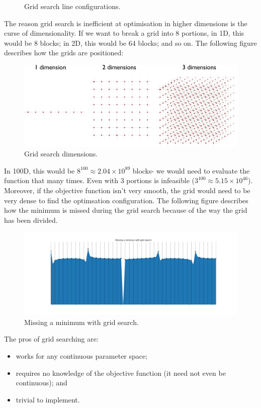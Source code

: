 \documentclass[a4paper, openany]{memoir}
\begin{document}
\begin{figure}[H]
    \caption{Grid search line configurations.}
\end{figure}
The reason grid search is inefficient at optimisation in higher dimensions is the curse of dimensionality. If we want to break a grid into 8 portions, in 1D, this would be 8 blocks; in 2D, this would be 64 blocks; and so on. The following figure describes how the grids are positioned:
\begin{figure}[H]
    \centering
    \includegraphics[scale=0.3]{src/4.13 grid search dimensions.png}
    \caption{Grid search dimensions.}
\end{figure}
\noindent In 100D, this would be $8^{100} \approx 2.04 \times 10^{89}$ blocks- we would need to evaluate the function that many times. Even with 3 portions is infeasible ($3^{100} \approx 5.15 \times 10^{46}$). Moreover, if the objective function isn't very smooth, the grid would need to be very dense to find the optimsation configuration. The following figure describes how the minimum is missed during the grid search because of the way the grid has been divided.
\begin{figure}[H]
    \centering
    \includegraphics[scale=0.25]{src/4.14 density of grid search.png}
    \caption{Missing a minimum with grid search.}
\end{figure}
The pros of grid searching are:
\begin{itemize}
    \item works for any continuous parameter space;
    \item requires no knowledge of the objective function (it need not even be continuous); and
    \item trivial to implement.
\end{itemize}
\end{document}
